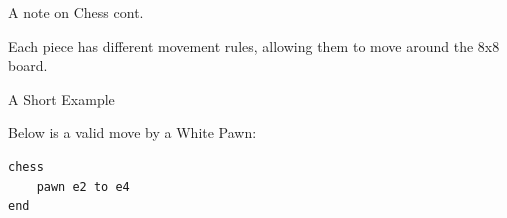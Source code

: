 \documentclass{beamer}
\begin{document}


    

\begin{frame}{A note on Chess cont.}

Each piece has different movement rules, allowing them to move around the 8x8 board.
    
\begin{figure}[h]
    \centering
    \newgame
    \scalebox{0.60}{\showboard}
    \quad
    \scalebox{0.60}{\showboard}
    \label{demonstratemovement}
\end{figure}
    
\end{frame}





\begin{frame}[fragile]{A Short Example}

Below is a valid move by a White Pawn:

\begin{figure}[h]
    \centering
    \newgame
    \scalebox{0.55}{\showboard}
    \quad
    \scalebox{0.55}{\showboard}
    \label{validpawnmove}
\end{figure}

\pause

\begin{lstlisting}
chess
    pawn e2 to e4
end
\end{lstlisting}

\end{frame}
\end{document}
